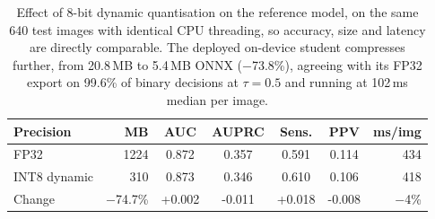 \begin{table}[!t]
\centering
\caption{Effect of 8-bit dynamic quantisation on the reference model, on the same 640 test images
with identical CPU threading, so accuracy, size and latency are directly comparable. The deployed
on-device student compresses further, from 20.8\,MB to
5.4\,MB ONNX ($-$73.8\%), agreeing
with its FP32 export on 99.6\% of binary decisions at
$\tau{=}0.5$ and running at 102\,ms median per image.}
\label{tab:quant}
\scriptsize
\setlength{\tabcolsep}{3.5pt}
\begin{tabular}{lrccccr}
\toprule
Precision & MB & AUC & AUPRC & Sens. & PPV & ms/img \\
\midrule
FP32 & 1224 & 0.872 & 0.357 & 0.591 & 0.114 & 434 \\
INT8 dynamic & 310 & 0.873 & 0.346 & 0.610 & 0.106 & 418 \\
\midrule
Change & $-$74.7\% & +0.002 & -0.011 & +0.018 & -0.008 & $-$4\% \\
\bottomrule
\end{tabular}
\end{table}
